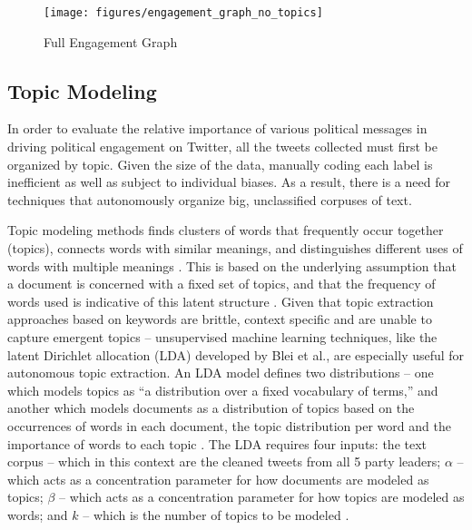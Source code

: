 \documentclass{nws}
\begin{document}
\begin{figure}[h!]
  \centering
  \texttt{[image: figures/engagement\_graph\_no\_topics]}
  \caption[Full Engagement Graph]{Full Engagement Graph}
  \label{fig:engagement_graph_no_topics}
\end{figure}

\subsection{Topic Modeling}

In order to evaluate the relative importance of various political messages in
driving political engagement on Twitter, all the tweets collected must first be
organized by topic. Given the size of the data, manually coding each label is
inefficient as well as subject to individual biases. As a result, there is a
need for techniques that autonomously organize big, unclassified corpuses of
text. 

Topic modeling methods finds clusters of words that frequently occur together
(topics), connects words with similar meanings, and distinguishes different uses
of words with multiple meanings \cite{alghamdi2015survey}. This is based on the
underlying assumption that a document is concerned with a fixed set of topics,
and that the frequency of words used is indicative of this latent structure
\cite{blei2003latent}. Given that topic extraction approaches based on keywords
are brittle, context specific and are unable to capture emergent topics --
unsupervised machine learning techniques, like the latent Dirichlet allocation
(LDA) developed by Blei et al., are especially useful for autonomous topic
extraction. An LDA model defines two distributions -- one which models topics as
``a distribution over a fixed vocabulary of terms,'' and another which models
documents as a distribution of topics based on the occurrences of words in each
document, the topic distribution per word and the importance of words to each
topic \cite{blei2003latent}. The LDA requires four inputs: the text corpus --
which in this context are the cleaned tweets from all 5 party leaders; $\alpha$
-- which acts as a concentration parameter for how documents are modeled as
topics; $\beta$ -- which acts as a concentration parameter for how topics are
modeled as words; and $k$ -- which is the number of topics to be modeled
\cite{blei2003latent}.
\end{document}

